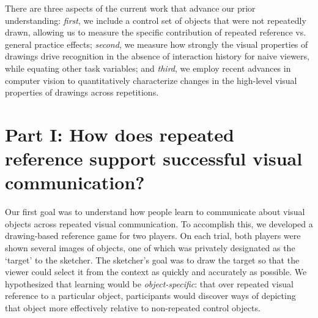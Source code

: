 \documentclass[10pt,letterpaper]{article}
\begin{document}

There are three aspects of the current work that advance our prior understanding: \emph{first}, we include a control set of objects that were not repeatedly drawn, allowing us to measure the specific contribution of repeated reference vs. general practice effects; \emph{second}, we measure how strongly the visual properties of drawings drive recognition in the absence of interaction history for naive viewers, while equating other task variables; and \emph{third}, we employ recent advances in computer vision to quantitatively characterize changes in the high-level visual properties of drawings across repetitions.



\section{Part I: How does repeated reference support successful visual communication?}

Our first goal was to understand how people learn to communicate about visual objects across repeated visual communication.
To accomplish this, we developed a drawing-based reference game for two players.
On each trial, both players were shown several images of objects, one of which was privately designated as the `target' to the sketcher.
The sketcher's goal was to draw the target so that the viewer could select it from the context as quickly and accurately as possible.
We hypothesized that learning would be \emph{object-specific}: that over repeated visual reference to a particular object, participants would discover ways of depicting that object more effectively relative to non-repeated control objects.


\end{document}
